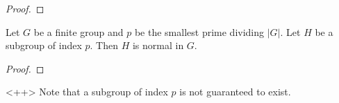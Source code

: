 \begin{proof}
\end{proof}

\begin{theorem}
  Let $G$ be a finite group and $p$ be the smallest prime dividing $|G|$. Let $H$ be a
  subgroup of index $p$. Then $H$ is normal in $G$.
  \label{thm:cauchyGeneral}
\end{theorem}
\begin{proof}
\end{proof}<++>
Note that a subgroup of index $p$ is not guaranteed to exist.
